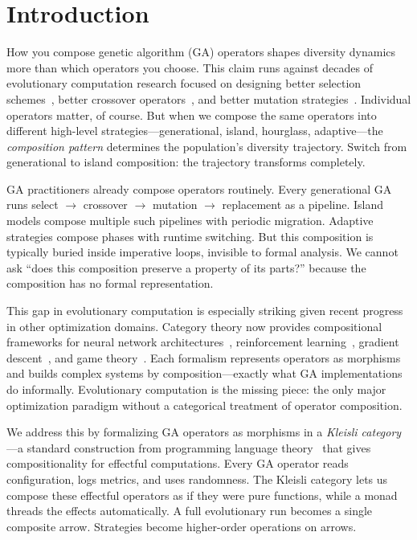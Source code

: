 \documentclass[dvipsnames,format=sigconf,anonymous=true,review=true]{acmart}
\begin{document}
\maketitle

\section{Introduction}

How you compose genetic algorithm (GA) operators shapes diversity dynamics more than which operators you choose. This claim runs against decades of evolutionary computation research focused on designing better selection schemes~\cite{blickle1996comparison}, better crossover operators~\cite{eshelman1993crossover}, and better mutation strategies~\cite{back1996evolutionary}. Individual operators matter, of course. But when we compose the same operators into different high-level strategies---generational, island, hourglass, adaptive---the \emph{composition pattern} determines the population's diversity trajectory. Switch from generational to island composition: the trajectory transforms completely.

GA practitioners already compose operators routinely. Every generational GA runs select $\to$ crossover $\to$ mutation $\to$ replacement as a pipeline. Island models compose multiple such pipelines with periodic migration. Adaptive strategies compose phases with runtime switching. But this composition is typically buried inside imperative loops, invisible to formal analysis. We cannot ask ``does this composition preserve a property of its parts?'' because the composition has no formal representation.

This gap in evolutionary computation is especially striking given recent progress in other optimization domains. Category theory now provides compositional frameworks for neural network architectures~\cite{gavranovic2024categorical}, reinforcement learning~\cite{bakirtzis2024compositional, hedges2024reinforcement}, gradient descent~\cite{hanks2024gradient}, and game theory~\cite{ghani2025approximate}. Each formalism represents operators as morphisms and builds complex systems by composition---exactly what GA implementations do informally. Evolutionary computation is the missing piece: the only major optimization paradigm without a categorical treatment of operator composition.

We address this by formalizing GA operators as morphisms in a \emph{Kleisli category}---a standard construction from programming language theory~\cite{moggi1991notions} that gives compositionality for effectful computations. Every GA operator reads configuration, logs metrics, and uses randomness. The Kleisli category lets us compose these effectful operators as if they were pure functions, while a monad threads the effects automatically. A full evolutionary run becomes a single composite arrow. Strategies become higher-order operations on arrows.
\end{document}
